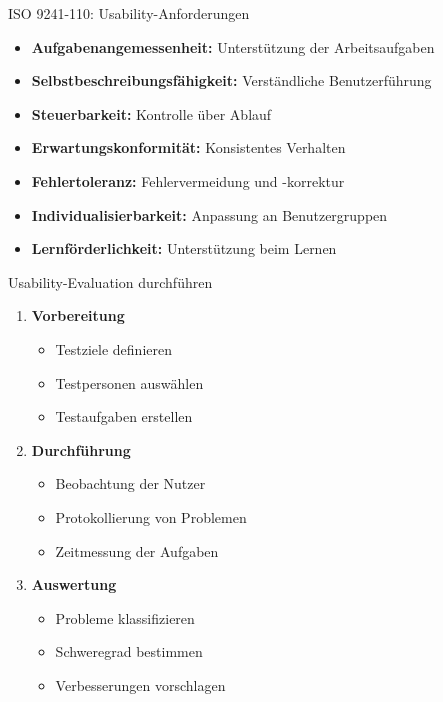 \begin{theorem}{ISO 9241-110: Usability-Anforderungen}
\begin{itemize}
    \item \textbf{Aufgabenangemessenheit:} Unterstützung der Arbeitsaufgaben
    \item \textbf{Selbstbeschreibungsfähigkeit:} Verständliche Benutzerführung
    \item \textbf{Steuerbarkeit:} Kontrolle über Ablauf
    \item \textbf{Erwartungskonformität:} Konsistentes Verhalten
    \item \textbf{Fehlertoleranz:} Fehlervermeidung und -korrektur
    \item \textbf{Individualisierbarkeit:} Anpassung an Benutzergruppen
    \item \textbf{Lernförderlichkeit:} Unterstützung beim Lernen
\end{itemize}
\end{theorem}

\begin{KR}{Usability-Evaluation durchführen}
\begin{enumerate}
    \item \textbf{Vorbereitung}
    \begin{itemize}
        \item Testziele definieren
        \item Testpersonen auswählen
        \item Testaufgaben erstellen
    \end{itemize}
    \item \textbf{Durchführung}
    \begin{itemize}
        \item Beobachtung der Nutzer
        \item Protokollierung von Problemen
        \item Zeitmessung der Aufgaben
    \end{itemize}
    \item \textbf{Auswertung}
    \begin{itemize}
        \item Probleme klassifizieren
        \item Schweregrad bestimmen
        \item Verbesserungen vorschlagen
    \end{itemize}
\end{enumerate}
\end{KR}

